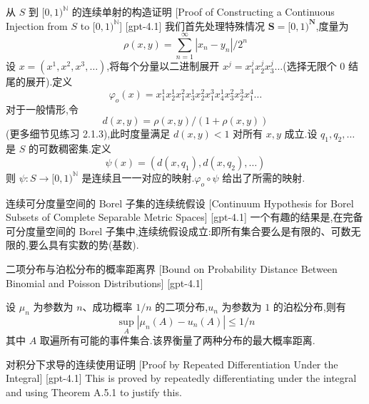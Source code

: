 \documentclass[UTF8]{ctexart}
\begin{document}
    
    
    \begin{prf}
        [Proof-of-Constructing-a-Continuous-Injection-from-$S$-to-$[0-1^{\mathbb{N}}$]
        {从 $S$ 到 $[0, 1)^{\mathbb{N}}$ 的连续单射的构造证明}
        [Proof of Constructing a Continuous Injection from $S$ to $[0, 1)^{\mathbb{N}}$]
        [gpt-4.1]
        我们首先处理特殊情况 $\boldsymbol{S} = [0, 1)^{\mathbf{N}}$,度量为
\[
\rho(x, y) = \sum_{n=1}^{\infty} |x_n - y_n| / 2^n
\]
设 $x = (x^{1}, x^{2}, x^{3}, \ldots)$,将每个分量以二进制展开 $x^{j} = x_{1}^{j} x_{2}^{j} x_{3}^{j} \ldots$(选择无限个 0 结尾的展开).定义
\[
\varphi_{o}(x) = x_{1}^{1} x_{2}^{1} x_{1}^{2} x_{3}^{1} x_{2}^{2} x_{1}^{3} x_{4}^{1} x_{3}^{2} x_{2}^{3} x_{1}^{4} \ldots
\]
对于一般情形,令
\[
d(x, y) = \rho(x, y) / (1 + \rho(x, y))
\]
(更多细节见练习 2.1.3),此时度量满足 $d(x, y) < 1$ 对所有 $x, y$ 成立.设 $q_{1}, q_{2}, \ldots$ 是 $S$ 的可数稠密集.定义
\[
\psi(x) = (d(x, q_{1}), d(x, q_{2}), \ldots)
\]
则 $\psi: S \to [0, 1)^{\mathbb{N}}$ 是连续且一一对应的映射.$\varphi_{o} \circ \psi$ 给出了所需的映射.
    \end{prf}
    
    
    
    \begin{crl}
        {连续可分度量空间的 Borel 子集的连续统假设}
        [Continuum Hypothesis for Borel Subsets of Complete Separable Metric Spaces]
        [gpt-4.1]
        一个有趣的结果是,在完备可分度量空间的 Borel 子集中,连续统假设成立:即所有集合要么是有限的、可数无限的,要么具有实数的势(基数).
    \end{crl}
    
    
    
    \begin{thm}
        {二项分布与泊松分布的概率距离界}
        [Bound on Probability Distance Between Binomial and Poisson Distributions]
        [gpt-4.1]
        
设 $\mu_n$ 为参数为 $n$、成功概率 $1/n$ 的二项分布,$
u_n$ 为参数为 $1$ 的泊松分布,则有
\[
\sup_{A} | \mu_n(A) - 
u_n(A) | \leq 1/n
\]
其中 $A$ 取遍所有可能的事件集合.该界衡量了两种分布的最大概率距离.

    \end{thm}
    
    
    
    \begin{prf}
        {对积分下求导的连续使用证明}
        [Proof by Repeated Differentiation Under the Integral]
        [gpt-4.1]
        This is proved by repeatedly differentiating under the integral and using Theorem A.5.1 to justify this.
    \end{prf}
    
\end{document}
